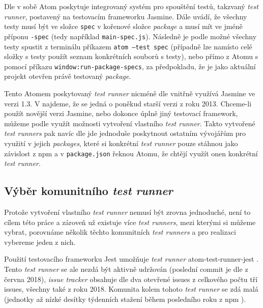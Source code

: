 Dle \cite{atom-docs} v sobě Atom poskytuje integrovaný systém pro spouštění testů, takzvaný \textit{test runner},
postavený na testovacím frameworku Jasmine. Dále \cite{atom-docs} uvádí, že všechny testy musí být ve složce
\texttt{spec} v kořenové složce \textit{package} a musí mít ve jméně příponu \texttt{-spec} (tedy
například \texttt{main-spec.js}). Následně je podle \cite{atom-docs} možné všechny testy spustit z terminálu
příkazem \texttt{atom --test spec} (případně lze namísto celé složky s testy použít seznam
konkrétních souborů s testy), nebo přímo z Atomu s pomocí příkazu \texttt
{window:run-package-specs}, za předpokladu, že je jako aktuální projekt otevřen právě testovaný \textit{package}.

Tento Atomem poskytovaný \textit{test runner} nicméně dle \cite{atom-docs} vnitřně využívá Jasmine ve verzi 1.3. V
\cite{jasmine-releases} najdeme, že se jedná o poněkud starší verzi z roku 2013. Chceme-li použít novější verzi Jasmine,
nebo dokonce úplně jiný testovací framework, můžeme podle \cite{atom-docs} využít možnosti vytvoření vlastního
\textit{test runner}. Takto vytvořené \textit{test runners} pak navíc dle \cite{atom-docs} jde jednoduše poskytnout
ostatním vývojářům pro využití v jejich \textit{packages}, které si konkrétní \textit{test runner} pouze stáhnou jako
závislost z npm a v \texttt{package.json} řeknou Atomu, že chtějí využít onen konkrétní \textit{test runner}.

\subsection{Výběr komunitního \textit{test runner}}
\label{vyber-komunitniho-test-runner}

Protože vytvoření vlastního \textit{test runner} nemusí být zrovna jednoduché, není to cílem této práce a zároveň
už existuje více \textit{test runners}, mezi kterými si můžeme vybrat, porovnáme několik těchto komunitních \textit{
test runners} a pro realizaci vybereme jeden z nich.

Použití testovacího frameworku Jest umožňuje \textit{test runner} atom-test-runner-jest \cite{test-runner-jest-github}.
Tento \textit{test runner} se ale nezdá být aktivně udržován (poslední commit je dle \cite{test-runner-jest-github} z
června 2018), \textit{issue tracker} obsahuje dle \cite{test-runner-jest-github} dva otevřené issues z celkového počtu
tří issues, všechny také z roku 2018. Komunita kolem tohoto \textit{test runner} se zdá malá (jednotky až nízké desítky
týdenních stažení během posledního roku z npm \cite{npm}).

